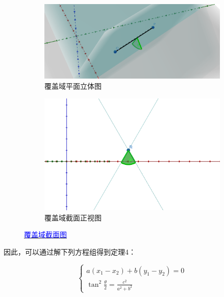 \begin{figure}[htbp]
    \centering
    \begin{subfigure}[b]{0.45\textwidth}
        \centering
        \includegraphics[scale=0.15]{res/img/覆盖域平面_几何.png}
        \caption{覆盖域平面立体图}
        \label{fig:覆盖域平面立体图}
    \end{subfigure}
    \hfill
    \begin{subfigure}[b]{0.45\textwidth}
        \centering
        \includegraphics[scale=0.15]{res/img/覆盖域平面_截面正视图.png}
        \caption{覆盖域截面正视图}
        \label{fig:覆盖域截面正视图}
    \end{subfigure}
    \caption{\href{https://www.geogebra.org/m/zafwcq6e}{\textcolor{blue}{覆盖域截面图}}}
    \label{fig:覆盖域截面图}
\end{figure}

因此，可以通过解下列方程组得到定理4：

\begin{equation}
    \begin{cases}
        a(x_1 - x_2) + b(y_1 - y_2) = 0 \\
        \tan^2\frac{\theta}{2} = \frac{c^2}{a^2 + b^2}
    \end{cases}
\end{equation}

